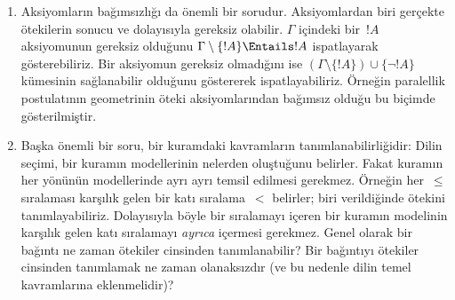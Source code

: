 \begin{explain}
\begin{enumerate}
  model kurmak için mantıksal yöntemleri kullanabiliriz.
\item Aksiyomların bağımsızlığı da önemli bir sorudur. Aksiyomlardan
  biri gerçekte ötekilerin sonucu ve dolayısıyla gereksiz olabilir.
  $\Gamma$ içindeki bir~$!A$ aksiyomunun gereksiz olduğunu
  $\Gamma\setminus\{!A\}\Entails !A$ ispatlayarak gösterebiliriz.
  Bir aksiyomun gereksiz olmadığını ise
  $(\Gamma\setminus\{!A\})\cup\{\lnot !A\}$ kümesinin sağlanabilir
  olduğunu göstererek ispatlayabiliriz. Örneğin paralellik
  postulatının geometrinin öteki aksiyomlarından bağımsız olduğu bu
  biçimde gösterilmiştir.
\item Başka önemli bir soru, bir kuramdaki kavramların
  tanımlanabilirliğidir: Dilin seçimi, bir kuramın modellerinin nelerden
  oluştuğunu belirler. Fakat kuramın her yönünün modellerinde ayrı ayrı
  temsil edilmesi gerekmez. Örneğin her~$\leq$ sıralaması karşılık
  gelen bir katı sıralama~$<$ belirler; biri verildiğinde ötekini
  tanımlayabiliriz. Dolayısıyla böyle bir sıralamayı içeren bir kuramın
  modelinin karşılık gelen katı sıralamayı \emph{ayrıca} içermesi
  gerekmez. Genel olarak bir bağıntı ne zaman ötekiler cinsinden
  tanımlanabilir? Bir bağıntıyı ötekiler cinsinden tanımlamak ne zaman
  olanaksızdır (ve bu nedenle dilin temel kavramlarına eklenmelidir)?
\end{enumerate}
\end{explain}

